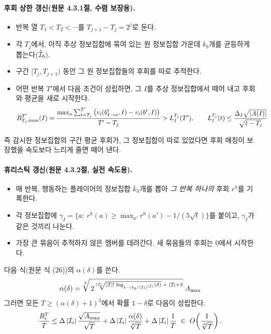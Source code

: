 \paragraph{후회 상한 갱신(원문 4.3.1절, 수렴 보장용).}
\begin{itemize}
  \item 반복 열 $T_1<T_2<\cdots$를 $T_{j+1}-T_j=2^j$로 둔다.
  \item 각 $T_j$에서, 아직 추상 정보집합에 묶여 있는 원 정보집합 가운데 $k_b$개를 균등하게 뽑는다($\hat{\mathcal{I}}_b$).
  \item 구간 $[T_j,T_{j+1})$ 동안 그 원 정보집합들의 후회를 따로 추적한다.
  \item 어떤 반복 $T'$에서 다음 조건이 성립하면, 그 $I$를 추상 정보집합에서 떼어 내고 후회와 평균을 새로 시작한다.
  \[
  R^{T'}_{T_j,\mathrm{imm}}(I)=\frac{\max_{a}\sum_{t=T_j}^{T'}\big(v_i(b^t_{I\to a},I)-v_i(b^t,I)\big)}{T'-T_j}>L_I^{T_j}(T'),\qquad L_I^{T_j}(t)\le\frac{\Delta_I\sqrt{\left\lvert A(I)\right\rvert}}{\sqrt{t-T_j}}
  \]
\end{itemize}
즉 감시한 정보집합의 구간 평균 후회가, 그 정보집합이 따로 있었다면 후회 매칭이 보장했을 속도보다 느리게 줄면 떼어 낸다.

\paragraph{휴리스틱 갱신(원문 4.3.2절, 실전 속도용).}
\begin{itemize}
  \item 매 반복, 행동하는 플레이어의 정보집합 $k_h$개를 뽑아 \emph{그 반복 하나의} 후회 $r^h$를 기록한다.
  \item 각 정보집합에 $\gamma_I=\{a:\ r^h(a)\ge\max_{a'}r^h(a')-1/(5\sqrt t)\}$를 붙이고, $\gamma_I$가 같은 것끼리 나눈다.
  \item 가장 큰 묶음이 추적하지 않은 멤버를 데려간다. 새 묶음들의 후회는 0에서 시작한다.
\end{itemize}

\begin{theorem}\label{thm:ira}
다음 식(원문 식 (26))의 $\alpha(\delta)$를 쓴다. 
\[
\alpha(\delta)=\sqrt[3]{\,2^{\sqrt[\left\lvert \mathcal{I}\right\rvert]{\left\lvert \mathcal{I}\right\rvert!\,\log_{1-(k_b/\left\lvert \mathcal{I}\right\rvert)^{\left\lvert \mathcal{I}\right\rvert}}(\delta)}\;+\;\left\lvert \mathcal{I}\right\rvert+3}}\;A_{\max}
\]
그러면 모든 $T\ge(\alpha(\delta)+1)^3$에서 확률 $1-\delta$로 다음이 성립한다.
\[
\frac{R_i^T}{T}\le\Delta\abs{\cI_i}\frac{\sqrt{A_{\max}}}{\sqrt T}+\Delta\abs{\cI_i}\frac{\alpha(\delta)}{\sqrt[3]T}+\Delta\abs{\cI_i}\frac1T\ \in\ O\!\left(\frac1{\sqrt[3]T}\right).
\]
\end{theorem}
